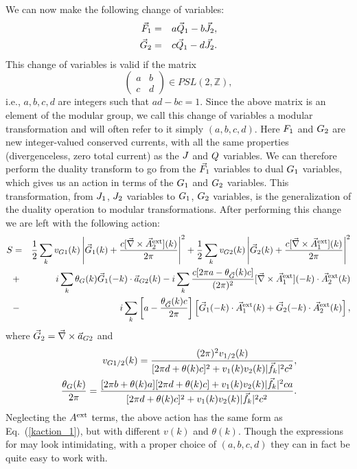 We can now make the following change of variables:\cite{Gen2Loops,FQHE}
\begin{eqnarray}
\vec{F}_1 &=& a\vec{Q}_1 - b\vec{J}_2,\\
\vec{G}_2 &=& c\vec{Q}_1 - d\vec{J}_2.
\label{modularshift}
\end{eqnarray}
This change of variables is valid if the matrix
\begin{equation}
\begin{pmatrix}
a & b \\
c & d 
\end{pmatrix}
\in PSL(2,\mathbb{Z}),
\end{equation}
i.e.,  $a,b,c,d$ are integers such that $ad-bc=1$. Since the above matrix is an element of the modular group, we call this change of variables a modular transformation and will often refer to it simply $(a,b,c,d)$. Here $F_1$ and $G_2$ are new integer-valued conserved currents, with all the same properties (divergenceless, zero total current) as the $J$ and $Q$ variables. We can therefore perform the duality transform to go from the $\vec{F}_1$ variables to dual $G_1$ variables, which gives us an action in terms of the $G_1$ and $G_2$ variables. This transformation, from $J_1$, $J_2$ variables to $G_1$, $G_2$ variables, is the generalization of the duality operation to modular transformations. After performing this change we are left with the following action:
\begin{eqnarray}
S&=&\frac{1}{2}\sum_k v_{G1}(k) \left|\vec{G}_1(k)+\frac{c[\vec{\nabla}\times\vec{A}_{2}^{\rm ext}](k)}{2\pi}\right|^2
+\frac{1}{2}\sum_k v_{G2}(k)\left|\vec{G}_2(k)+\frac{c[\vec{\nabla}\times\vec{A}_{1}^{\rm ext}](k)}{2\pi}\right|^2\nonumber\\
&+&i\sum_k \theta_{G}(k) \vec{G}_1(-k)\cdot \vec{a}_{G2}(k)
-i\sum_k \frac{c[2\pi a-\theta_{\vec{G}}(k)c]}{(2\pi)^2} [\vec{\nabla}\times\vec{A}_{1}^{\rm ext}](-k)\cdot \vec{A}_{2}^{\rm ext}(k)\nonumber\\
&-& i\sum_k \left[a - \frac{\theta_{\vec{G}}(k) c}{2\pi}\right]\left[\vec{G}_1(-k) \cdot \vec{A}_{1}^{\rm ext}(k) + \vec{G}_2(-k) \cdot \vec{A}_{2}^{\rm ext}(k) \right],
\label{gaction}
\end{eqnarray}
where $\vec{G}_2=\vec{\nabla}\times \vec{a}_{G2}$ and
\begin{eqnarray}
&&\!\!\!\!\! v_{\cG1/2}(k)=\frac{(2\pi)^2v_{1/2}(k)}{[2\pi d+\theta(k) c]^2+ v_{1}(k)v_{2}(k)|\vec{f}_k|^2c^2},\label{VJ}\\
&&\!\!\!\!\! \frac{\theta_{\cG}(k)}{2\pi}=\frac{[2\pi b+\theta(k) a][2\pi d + \theta(k) c]+v_{1}(k)v_{2}(k)|\vec{f}_k|^2ca}{[2\pi d+\theta(k) c]^2+ v_{1}(k)v_{2}(k)|\vec{f}_k|^2c^2}.\label{TJ}
\end{eqnarray}
Neglecting the $A^{\rm ext}$ terms, the above action has the same form as Eq.~(\ref{kaction_1}), but with different $v(k)$ and $\theta(k)$. Though the expressions for may look intimidating, with a proper choice of $(a,b,c,d)$ they can in fact be quite easy to work with. 

